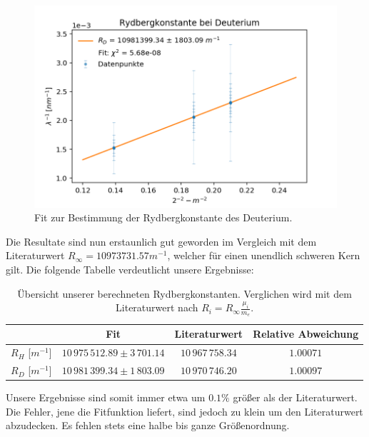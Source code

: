 \documentclass[]{article}
\begin{document}
\begin{figure}[H]
\centering
\includegraphics[width=1\textwidth]{Plots/R_D.png}
\caption{ Fit zur Bestimmung der Rydbergkonstante des Deuterium.}
\label{fig:Rydberg D}
\end{figure}

Die Resultate sind nun erstaunlich gut geworden im Vergleich mit dem Literaturwert $R_\infty = 10973731.57 m^{-1}$, welcher für einen unendlich schweren Kern gilt. Die folgende Tabelle verdeutlicht unsere Ergebnisse:

\begin{table}[H]
	\centering
	\begin{tabular}{c|c|c|c}
		  & Fit & Literaturwert & Relative Abweichung  \\
		\hline
		$R_H$ [$m^{-1}$]& $10\,975\,512.89\pm 3\,701.14$ & $10\,967\,758.34$ & $1.00071$ \\
		\hline
		$R_D$ [$m^{-1}$]& $10\,981\,399.34\pm 1\,803.09$ & $10\,970\,746.20$ & $1.00097$ \\
	\end{tabular}
	\caption{Übersicht unserer berechneten Rydbergkonstanten. Verglichen wird mit dem Literaturwert nach $R_i = R_\infty \frac{\mu_i}{m_e}$.}
\end{table}

Unsere Ergebnisse sind somit immer etwa um $0.1\%$ größer als der Literaturwert. Die Fehler, jene die Fitfunktion liefert, sind jedoch zu klein um den Literaturwert abzudecken. Es fehlen stets eine halbe bis ganze Größenordnung.
\end{document}
